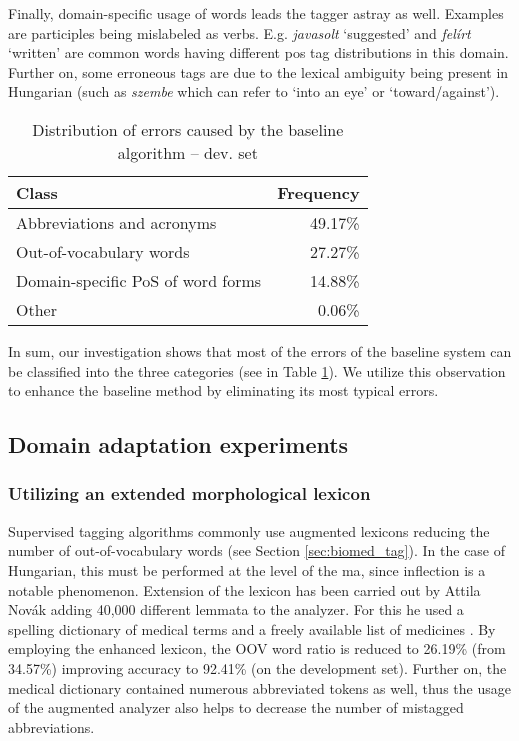 Finally, domain-specific usage of words leads the tagger astray as well. 
Examples are participles being mislabeled as verbs. 
E.g. \textit{javasolt} `suggested’  and  \textit{felírt} `written’ are common words having different \acrshort{pos} tag distributions in this domain. 
Further on, some erroneous tags are due to the lexical ambiguity being present in Hungarian (such as \textit{szembe} which can refer to `into an eye’ or `toward/against’). 

\begin{table}[H]
\centering
\caption{Distribution of errors caused by the baseline algorithm -- dev. set}
\label{tab:error_types}
\begin{tabular}{ l r } 
\hline
Class & Frequency  \\
\hline
Abbreviations and acronyms & 49.17\% \\
Out-of-vocabulary words & 27.27\% \\
Domain-specific PoS of word forms & 14.88\% \\
Other & 0.06\% \\
\hline
\end{tabular}
\end{table}

In sum, our investigation shows that most of the errors of the baseline system can be classified into the three categories (see in Table \ref{tab:error_types}). 
We utilize this observation to enhance the baseline method by eliminating its most typical errors.

\subsection{Domain adaptation experiments}


\subsubsection{Utilizing an extended morphological lexicon}
\label{sec:ma-extension}

Supervised tagging algorithms commonly use augmented lexicons reducing the number of out-of-vocabulary words (see Section \ref{sec:biomed_tag}). 
In the case of Hungarian, this must be performed at the level of the \acrshort{ma}, since inflection is a notable phenomenon. 
Extension of the lexicon has been carried out by Attila Novák \cite{Orosz2014} adding 40,000 different lemmata to the analyzer. 
For this he used a spelling dictionary of medical terms \cite{Fabian1992} and a freely available list of medicines \cite{Foigazgatosag2012}.
By employing the enhanced lexicon, the OOV word ratio is reduced to 26.19\% (from 34.57\%) improving accuracy to 92.41\% (on the development set). 
Further on, the medical dictionary \cite{Fabian1992} contained numerous abbreviated tokens as well, thus the usage of the augmented analyzer also helps to decrease the number of mistagged abbreviations.

